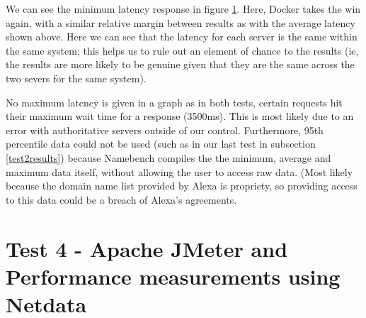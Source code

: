 We can see the minimum latency response in figure \ref{fig:test3graphmin}. Here, Docker takes the win again, with a similar relative margin between results as with the average latency shown above. Here we can see that the latency for each server is the same within the same system; this helps us to rule out an element of chance to the results (ie, the results are more likely to be genuine given that they are the same across the two severs for the same system).

\begin{figure}[H]
\caption{}
\label{fig:test3graphmin}
\centering
\end{figure}

No maximum latency is given in a graph as in both tests, certain requests hit their maximum wait time for a response (3500ms). This is most likely due to an error with authoritative servers outside of our control. Furthermore, 95th percentile data could not be used (such as in our last test in subsection \ref{test2results}) because Namebench compiles the the minimum, average and maximum data itself, without allowing the user to access raw data. (Most likely because the domain name list provided by Alexa \citep{alexainternet} is propriety, so providing access to this data could be a breach of Alexa's agreements.

\section{Test 4 - Apache JMeter and Performance measurements using Netdata}
\label{sec:Test4}
